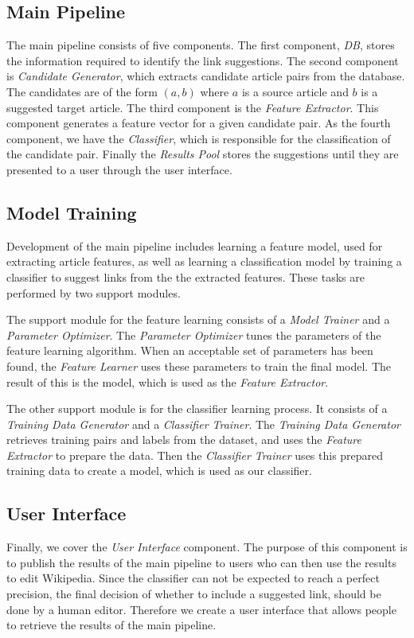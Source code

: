 \subsection{Main Pipeline}
The main pipeline consists of five components. The first component, \emph{DB}, stores the information required to identify the link suggestions. The second component is \emph{Candidate Generator}, which extracts candidate article pairs from the database. The candidates are of the form $(a,b)$ where $a$ is a source article and $b$ is a suggested target article. The third component is the \emph{Feature Extractor}. This component generates a feature vector for a given candidate pair. As the fourth component, we have the \emph{Classifier}, which is responsible for the classification of the candidate pair. Finally the \emph{Results Pool} stores the suggestions until they are presented to a user through the user interface.

\subsection{Model Training}
Development of the main pipeline includes learning a feature model, used for extracting article features, as well as learning a classification model by training a classifier to suggest links from the the extracted features. These tasks are performed by two support modules.

The support module for the feature learning consists of a \emph{Model Trainer} and a \emph{Parameter Optimizer}. The \emph{Parameter Optimizer} tunes the parameters of the feature learning algorithm. When an acceptable set of parameters has been found, the \emph{Feature Learner} uses these parameters to train the final model. The result of this is the model, which is used as the \emph{Feature Extractor}.

The other support module is for the classifier learning process. It consists of a \emph{Training Data Generator} and a \emph{Classifier Trainer}. The \emph{Training Data Generator} retrieves training pairs and labels from the dataset, and uses the \emph{Feature Extractor} to prepare the data. Then the \emph{Classifier Trainer} uses this prepared training data to create a model, which is used as our classifier.

\subsection{User Interface}
Finally, we cover the \emph{User Interface} component. The purpose of this component is to publish the results of the main pipeline to users who can then use the results to edit Wikipedia. Since the classifier can not be expected to reach a perfect precision, the final decision of whether to include a suggested link, should be done by a human editor. Therefore we create a user interface that allows people to retrieve the results of the main pipeline.

